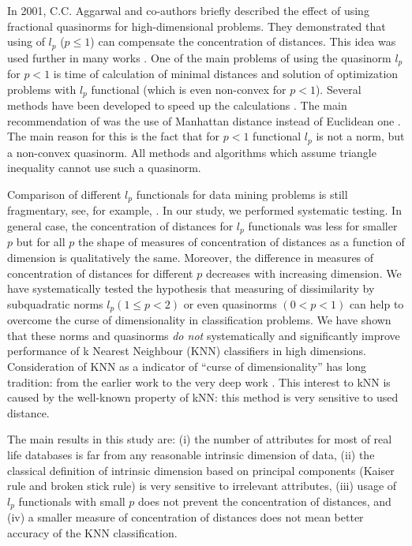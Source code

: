\documentclass[entropy,article,submit,moreauthors,pdftex]{Definitions/mdpi}
\begin{document}
In 2001, C.C. Aggarwal and co-authors \cite{aggarwal2001} briefly described the effect of using  fractional quasinorms for high-dimensional problems. They demonstrated that using of $l_p$ ($p\leq1$) can compensate the concentration of distances. This idea was used further in many works \cite{cormode2002fast, datar2004locality, radovanovic2010}. One of the main problems of using the quasinorm $l_p$ for $p<1$ is time of calculation of minimal distances and solution of optimization problems with $l_p$ functional (which is even non-convex for $p<1$). Several methods have been developed to speed up the calculations \cite{cormode2002fast, gorban2018PQSQ}. The main recommendation of \cite{aggarwal2001} was the use of Manhattan distance instead of Euclidean one \cite{Allen2014, elkan2003using, chang2003cbsa}. The main reason for this is the fact that for $p<1$ functional $l_p$ is not a norm, but a non-convex quasinorm. All methods and algorithms which assume triangle inequality \cite{elkan2003using, demartines1994analyse, yianilos1999excluded} cannot use such a quasinorm.

Comparison of different $l_p$ functionals for data mining problems is still fragmentary, see, for example, \cite{aggarwal2001, singh2013k, hu2016distance}. In our study, we performed systematic testing. In general case, the concentration of distances  for $l_p$ functionals was less for smaller $p$ but for all $p$ the shape of measures of concentration of distances as a function of dimension is qualitatively the same. Moreover, the difference in measures of concentration of distances for different $p$ decreases with increasing dimension.
We have systematically tested the hypothesis that measuring of dissimilarity by subquadratic norms $l_p (1\leq p<2)$ or even quasinorms $(0< p<1)$ can help to overcome the curse of dimensionality in classification problems. We have shown that these norms and quasinorms {\it do not} systematically and significantly improve performance of k Nearest Neighbour (KNN) classifiers in high dimensions.
Consideration of KNN as a indicator of ``curse of dimensionality'' has long tradition: from the earlier work \cite{beyer1999} to the very deep work \cite{Pestov2013}. This interest to kNN is caused by the well-known property of kNN: this method is very sensitive to used distance.

The main results in this study are: (i) the number of attributes for most of real life databases is far from any reasonable intrinsic dimension of data, (ii) the classical definition of intrinsic dimension based on principal components (Kaiser rule and broken stick rule) is very sensitive to irrelevant attributes, (iii) usage of $l_p$ functionals with small $p$ does not prevent the concentration of distances, and (iv) a smaller measure of concentration of distances does not mean better accuracy of the KNN classification.
\end{document}
